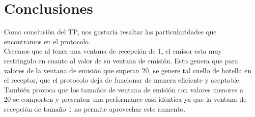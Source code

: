 \newpage
\section{Conclusiones}
\indent Como conclusión del TP, nos gustaría resaltar las particularidades que
encontramos en el protocolo.\\
\indent Creemos que al tener una ventana de recepción de 1, el emisor esta muy
restringido en cuanto al valor de su ventana de emisión. Esto genera que para
valores de la ventana de emisión que superan 20, se genere tal cuello de botella
en el receptor, que el protocolo deja de funcionar de manera eficiente y aceptable. También provoca que los tamaños de ventana de emisión con valores menores a 20 se comporten y presenten una performance casi idéntica ya que la ventana de recepción de tamaño 1 no permite aprovechar este aumento.\\
\indent 